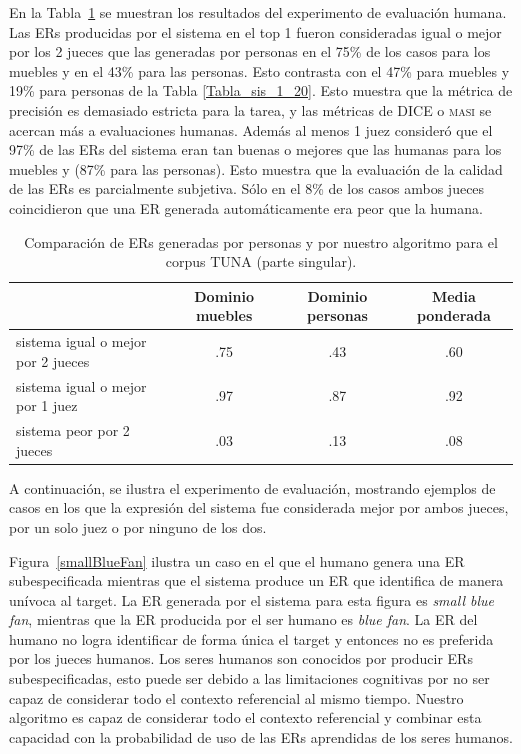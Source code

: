 En la Tabla~\ref{system-versus-human} se muestran los resultados del experimento de evaluaci\'on humana.
Las ERs producidas por el sistema en el top 1 fueron consideradas igual o mejor por los 2 jueces que las generadas por personas en el 75\% de los casos para los muebles y en el 43\% para las personas. Esto contrasta con el 47\% para muebles y 19\% para personas de la Tabla \ref{Tabla_sis_1_20}. Esto muestra que la m\'etrica de precisi\'on es demasiado estricta para la tarea, y las m\'etricas de DICE o \textsc {masi} se acercan m\'as a evaluaciones humanas. Adem\'as al menos 1 juez consider\'o que el 97\% de las ERs del sistema eran tan buenas o mejores que las humanas para los muebles y (87\% para las personas). Esto muestra que la evaluaci\'on de la calidad de las ERs es parcialmente subjetiva. S\'olo en el 8\% de los casos ambos jueces coincidieron que una ER generada autom\'aticamente era peor que la humana.

\begin{table}[H]
\begin{center}
\begin{tabular}{|l|c|c|c|}
\hline

 & Dominio muebles & Dominio personas & Media ponderada \\
\hline
sistema igual o mejor por 2 jueces  &.75  &       .43	&       .60 \\
sistema igual o mejor por 1 juez  &.97	&	.87	&	.92 \\
sistema peor por 2 jueces &	.03	&	.13	&	.08 \\
\hline
\end{tabular}
\caption{Comparaci\'on de ERs generadas por personas y por nuestro algoritmo para el corpus TUNA (parte singular).} 
\label{system-versus-human}
\vspace*{-.5cm}
\end{center}
\end{table}

A continuaci\'on, se ilustra el experimento de evaluaci\'on, mostrando ejemplos de casos en los que la expresi\'on del sistema fue considerada mejor por ambos jueces, por un solo juez o por ninguno de los dos.

Figura~\ref{smallBlueFan} ilustra un caso en el que el humano genera una ER subespecificada mientras que el sistema produce un ER que identifica de manera un\'{i}voca al target. La ER generada por el sistema para esta figura es {\it small blue fan}, mientras que la ER producida por el ser humano es {\it blue fan}. La ER del humano no logra identificar de forma \'unica el target y entonces no es preferida por los jueces humanos. Los seres humanos son conocidos por producir ERs subespecificadas, esto puede ser debido a las limitaciones cognitivas por no ser capaz de considerar todo el contexto referencial al mismo tiempo. Nuestro algoritmo es capaz de considerar todo el contexto referencial y combinar esta capacidad con la probabilidad de uso de las ERs aprendidas de los seres humanos.

